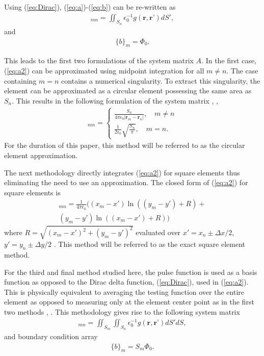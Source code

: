 Using (\ref{eq:Dirac}), (\ref{eq:a})-(\ref{eq:b}) can be re-written as
\begin{align}
    [A]_{mn}=\iint_{S_{n}} \epsilon_0^{-1}g(\textbf{r},\textbf{r'})dS',
    \label{eq:a2}
\end{align}
and 
\begin{align}
    \{b\}_m=\Phi_0.
    \label{eq:b2}
\end{align}

This leads to the first two formulations of the system matrix $A$. In the first case, (\ref{eq:a2}) can be approximated using midpoint integration for all $m \neq n$. The case containing $m=n$ contains a numerical singularity. To extract this singularity, the element can be approximated as a circular element possessing the same area as $S_n$. This results in the following formulation of the system matrix \cite{rothlecnotes}, \cite{jin2011theory},
\begin{align}
    [A]_{mn}=\begin{cases}
        \frac{S_n}{4\pi\epsilon_0|\textbf{r}_m-\textbf{r}_n|}, \quad m\neq n \\
        \frac{1}{2\epsilon_0}\sqrt{\frac{S_n}{\pi}}, \quad m=n.
    \end{cases}
    \label{eq:aaprox}
\end{align}
For the duration of this paper, this method will be referred to as the circular element approximation.

The next methodology directly integrates (\ref{eq:a2}) for square elements thus eliminating the need to use an approximation. The closed form of (\ref{eq:a2}) for square elements is
\begin{multline}
    [A]_{mn}=\frac{1}{4\pi\epsilon_0}\big((x_m-x')\ln((y_m-y')+R)+\\
    (y_m-y')\ln((x_m-x')+R)\big)
    \label{eq:aexact}
\end{multline}
where $R=\sqrt{(x_m-x')^2+(y_m-y')^2}$ evaluated over $x'=x_n\pm\Delta x / 2$, $y'=y_n\pm\Delta y / 2$ \cite{jin2011theory}. This method will be referred to as the exact square element method.

For the third and final method studied here, the pulse function is used as a basis function as opposed to the Dirac delta function, (\ref{eq:Dirac}), used in (\ref{eq:a2}). This is physically equivalent to averaging the testing function over the entire element as opposed to measuring only at the element center point as in the first two methods \cite{rothlecnotes}, \cite{jin2011theory}. This methodology gives rise to the following system matrix
\begin{align}
    [A]_{mn}=\iint_{S_m}\iint_{S_n} \epsilon_0^{-1}g(\textbf{r},\textbf{r'})dS'dS,
    \label{eq:a3}
\end{align}
and boundary condition array
\begin{align}
    \{b\}_m=S_m\Phi_0.
    \label{eq:b3}
\end{align}

